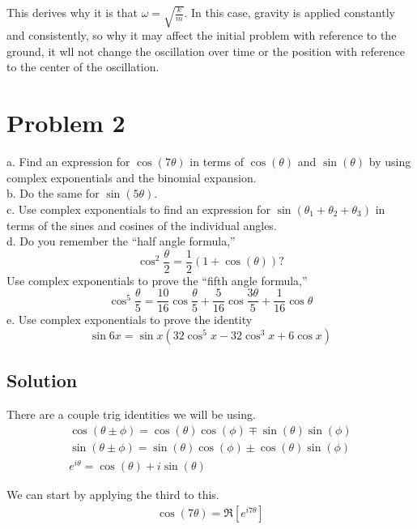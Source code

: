 \documentclass[12pt]{article}
\begin{document}
This derives why it is that \(\omega = \sqrt{\frac{k}{m}}\).
In this case, gravity is applied constantly and consistently, so why it may affect the initial problem with reference to the ground, it wll not change the oscillation over time or the position with reference to the center of the oscillation.

\pagebreak
\section{Problem 2}
a. Find an expression for $\cos(7\theta)$ in terms of $\cos(\theta)$ and $\sin(\theta)$ by using complex exponentials and the binomial expansion.\\
b. Do the same for $\sin(5\theta)$.\\
c. Use complex exponentials to ﬁnd an expression for $\sin(\theta_1 + \theta_2 + \theta_3)$ in terms of the sines and cosines of the individual angles.\\
d. Do you remember the “half angle formula,”
\[ \cos^2\frac{\theta}{2} = \frac{1}{2}(1 + \cos(\theta)) ?\]
Use complex exponentials to prove the “ﬁfth angle formula,”
\[ \cos^5 \frac{\theta}{5} = \frac{10}{16}\cos\frac{\theta}{5} + \frac{5}{16}\cos\frac{3\theta}{5} + \frac{1}{16}\cos\theta \]
e. Use complex exponentials to prove the identity
\[ \sin 6x = \sin x \left( 32\cos^5 x - 32\cos^3 x + 6\cos x \right) \]



\subsection{Solution}
There are a couple trig identities we will be using.
\begin{gather*}
    \cos(\theta \pm \phi) = \cos(\theta)\cos(\phi) \mp \sin(\theta)\sin(\phi)\\
    \sin(\theta \pm \phi) = \sin(\theta)\cos(\phi) \pm \cos(\theta)\sin(\phi)\\
    e^{i\theta} = \cos(\theta) + i\sin(\theta)
\end{gather*}

We can start by applying the third to this.
\begin{gather}
    \cos(7\theta) = \Re [e^{i7\theta}]
\end{gather}
\end{document}
